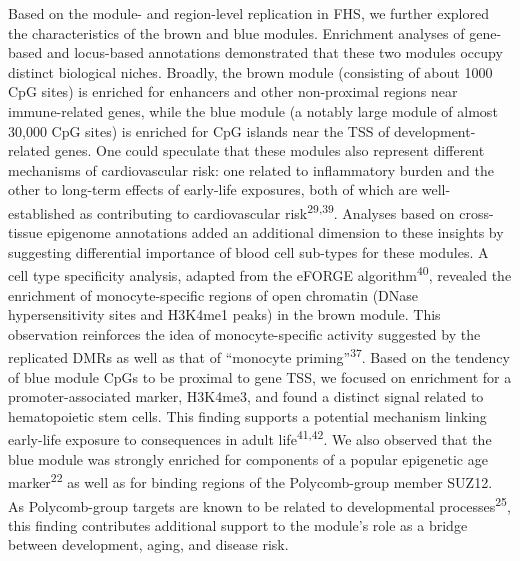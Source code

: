 \documentclass[]{article}
\theoremstyle{definition}
\theoremstyle{definition}
\theoremstyle{definition}
\theoremstyle{remark}
\begin{document}
Based on the module- and region-level replication in FHS, we further
explored the characteristics of the brown and blue modules. Enrichment
analyses of gene-based and locus-based annotations demonstrated that
these two modules occupy distinct biological niches. Broadly, the brown
module (consisting of about 1000 CpG sites) is enriched for enhancers
and other non-proximal regions near immune-related genes, while the blue
module (a notably large module of almost 30,000 CpG sites) is enriched
for CpG islands near the TSS of development-related genes. One could
speculate that these modules also represent different mechanisms of
cardiovascular risk: one related to inflammatory burden and the other to
long-term effects of early-life exposures, both of which are
well-established as contributing to cardiovascular
risk\textsuperscript{29,39}. Analyses based on cross-tissue epigenome
annotations added an additional dimension to these insights by
suggesting differential importance of blood cell sub-types for these
modules. A cell type specificity analysis, adapted from the eFORGE
algorithm\textsuperscript{40}, revealed the enrichment of
monocyte-specific regions of open chromatin (DNase hypersensitivity
sites and H3K4me1 peaks) in the brown module. This observation
reinforces the idea of monocyte-specific activity suggested by the
replicated DMRs as well as that of ``monocyte
priming''\textsuperscript{37}. Based on the tendency of blue module CpGs
to be proximal to gene TSS, we focused on enrichment for a
promoter-associated marker, H3K4me3, and found a distinct signal related
to hematopoietic stem cells. This finding supports a potential mechanism
linking early-life exposure to consequences in adult
life\textsuperscript{41,42}. We also observed that the blue module was
strongly enriched for components of a popular epigenetic age
marker\textsuperscript{22} as well as for binding regions of the
Polycomb-group member SUZ12. As Polycomb-group targets are known to be
related to developmental processes\textsuperscript{25}, this finding
contributes additional support to the module's role as a bridge between
development, aging, and disease risk.
\end{document}
